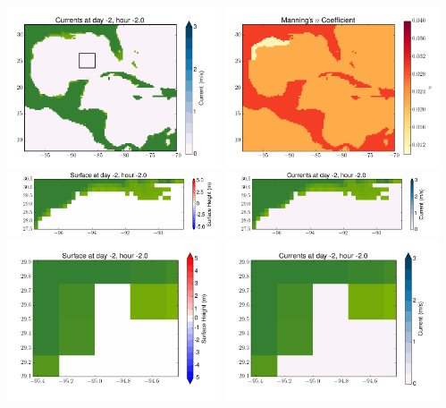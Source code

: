 \documentclass[11pt]{article}
\begin{document}
\includegraphics[width=0.475\textwidth]{frame0022fig2.png}
\vskip 10pt 
\includegraphics[width=0.475\textwidth]{frame0022fig3.png}
\includegraphics[width=0.475\textwidth]{frame0022fig4.png}
\vskip 10pt 
\includegraphics[width=0.475\textwidth]{frame0022fig5.png}
\includegraphics[width=0.475\textwidth]{frame0022fig6.png}
\vskip 10pt 
\includegraphics[width=0.475\textwidth]{frame0022fig7.png}
\end{document}

